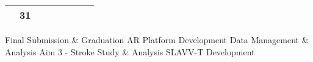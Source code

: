 {\begin{tabularx}{\linewidth}{|l!{\vrule width \myLenLineThicknessThick}*{7}{@{}X@{}|}}
       & 
    
      
      
        \begin{minipage}[t]{6mm}\centering{}31\end{minipage}
      
       & 
    
      
      
      
        \\  \hline 
      
    
  
  
  \end{tabularx}
}
\vfill{\centering{} \small{Final Submission \& Graduation}\hspace{ 1.5em } \small{AR Platform Development}\hspace{ 1.5em } \small{Data Management \& Analysis}\hspace{ 1.5em } \small{Aim 3 - Stroke Study \& Analysis}\hspace{ 1.5em } \small{SLAVV-T Development}\hspace{ 1.5em }\par}

